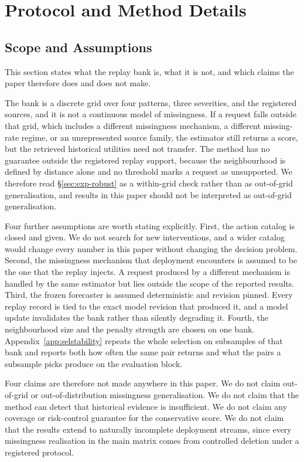 \documentclass{article}
\begin{document}
\section{Protocol and Method Details}
\label{app:protocol}
\subsection{Scope and Assumptions}
\label{app:scope}
This section states what the replay bank is, what it is not, and which claims the paper
therefore does and does not make.

The bank is a discrete grid over four patterns, three severities, and the registered sources,
and it is not a continuous model of missingness. If a request falls outside that grid, which
includes a different missingness mechanism, a different missing-rate regime, or an
unrepresented source family, the estimator still returns a score, but the retrieved
historical utilities need not transfer. The method has no guarantee outside the registered
replay support, because the neighbourhood is defined by distance alone and no threshold marks
a request as unsupported. We therefore read \S\ref{sec:exp-robust} as a within-grid check
rather than as out-of-grid generalisation, and results in this paper should not be interpreted
as out-of-grid generalisation.

Four further assumptions are worth stating explicitly. First, the action catalog is closed and
given. We do not search for new interventions, and a wider catalog would change every number
in this paper without changing the decision problem. Second, the missingness mechanism that
deployment encounters is assumed to be the one that the replay injects. A request produced by
a different mechanism is handled by the same estimator but lies outside the scope of the
reported results. Third, the frozen forecaster is assumed deterministic and revision pinned.
Every replay record is tied to the exact model revision that produced it, and a model update
invalidates the bank rather than silently degrading it. Fourth, the neighbourhood size and the
penalty strength are chosen on one bank. Appendix~\ref{app:selstability} repeats the whole
selection on subsamples of that bank and reports both how often the same pair returns and what
the pairs a subsample picks produce on the evaluation block.

Four claims are therefore not made anywhere in this paper. We do not claim out-of-grid or
out-of-distribution missingness generalisation. We do not claim that the method can detect
that historical evidence is insufficient. We do not claim any coverage or risk-control
guarantee for the conservative score. We do not claim that the results extend to naturally
incomplete deployment streams, since every missingness realisation in the main matrix comes
from controlled deletion under a registered protocol.
\end{document}

